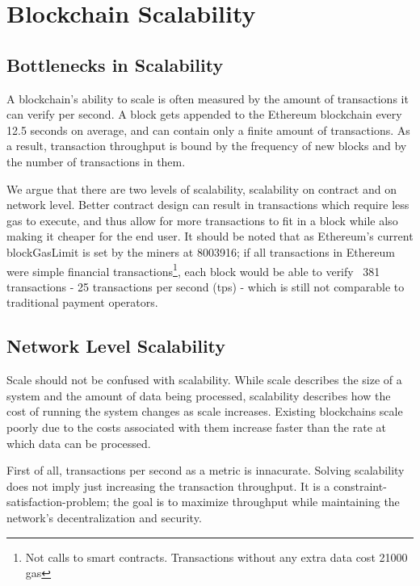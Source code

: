\chapter{Blockchain Scalability}\label{ch:scalability}

\section{Bottlenecks in Scalability}
A blockchain's ability to scale is often measured by the amount of transactions it can verify per second. A block gets appended to the Ethereum blockchain every 12.5 seconds on average, and can contain only a finite amount of transactions. As a result, transaction throughput is bound by the frequency of new blocks and by the number of transactions in them.

We argue that there are two levels of scalability, scalability on contract and on network level. Better contract design can result in transactions which require less gas to execute, and thus allow for more transactions to fit in a block while also making it cheaper for the end user. It should be noted that as Ethereum's current blockGasLimit is set by the miners at 8003916; if all transactions in Ethereum were simple financial transactions\footnote{Not calls to smart contracts. Transactions without any extra data cost 21000 gas}, each block would be able to verify ~381 transactions - 25 transactions per second (tps) - which is still not comparable to traditional payment operators. 

\section{Network Level Scalability}
Scale should not be confused with scalability. While scale describes the size of a system and the amount of data being processed, scalability describes how the cost of running the system changes as scale increases. Existing blockchains scale poorly due to the costs associated with them increase faster than the rate at which data can be processed. 

First of all, transactions per second as a metric is innacurate. Solving scalability does not imply just increasing the transaction throughput. It is a constraint-satisfaction-problem; the goal is to maximize throughput while maintaining the network's decentralization and security. 

